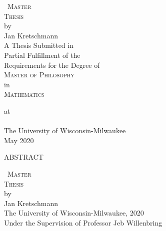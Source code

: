 \documentclass[12pt,letterpaper,oneside,openany]{book}
\newcommand{\name}{Jan Kretschmann}
\newcommand{\pglen}{390}
\newcommand{\pts}{12pt}
\newcommand{\vs}{\vspace{0.7cm}}
\newcommand{\mytitle}{\Large \textsc{\mbox{ Master}\\
  \mbox{Thesis}}\\[20pt] \normalsize by\\
  [20pt] \name  \\[\pts] \vs }
\begin{document}
\setlength{\baselineskip}{19pt}
\frontmatter




 \singlespace
{}

\pagestyle{plain}
\thispagestyle{empty}
\vs\vs 
\begin{center}
	\mytitle
	\vs
	A Thesis Submitted in \\
	Partial Fulfillment of the \\
	Requirements for the Degree of \\
	\vs \vs
	\textsc{Master of Philosophy } \\ %
	in \\
	\textsc{Mathematics} 
	\vs \vs

	at\\
	 \ \\
	The University of Wisconsin-Milwaukee\\ 
	May 2020
\end{center}

\pagebreak



%

\begin{center} 
	{\large ABSTRACT} 
\end{center}
\begin{center}
	\mytitle  The University of Wisconsin-Milwaukee, 2020 \\
	Under the Supervision of Professor Jeb Willenbring 
\end{center}
\end{document}
